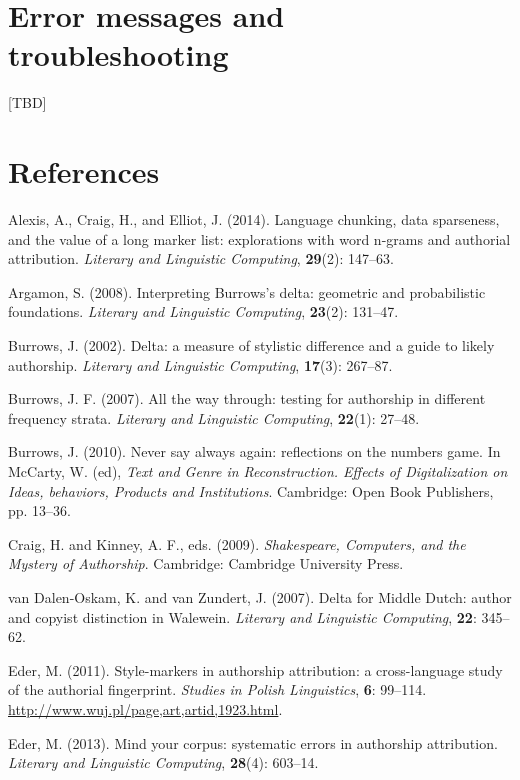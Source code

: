 \documentclass[11pt,a4paper]{article}
\begin{document}
\section{Error messages and troubleshooting}

[TBD]


\section*{References}


\indent

Alexis, A., Craig, H., and Elliot, J. (2014). Language chunking, data
sparseness, and the value of a long marker list: explorations with
word n-grams and authorial attribution. \textit{Literary and Linguistic
Computing}, \textbf{29}(2): 147--63.

Argamon, S. (2008). Interpreting Burrows’s delta: geometric and probabilistic
foundations. \textit{Literary and Linguistic Computing}, \textbf{23}(2):
131--47.

Burrows, J. (2002). Delta: a measure of stylistic difference and a
guide to likely authorship. \textit{Literary and Linguistic Computing},
\textbf{17}(3): 267--87.

Burrows, J. F. (2007). All the way through: testing for authorship
in different frequency strata. \textit{Literary and Linguistic Computing},
\textbf{22}(1): 27--48.

Burrows, J. (2010). Never say always again: reflections on the numbers
game. In McCarty, W. (ed), \textit{Text and Genre in Reconstruction.
Effects of Digitalization on Ideas, behaviors, Products and Institutions}.
Cambridge: Open Book Publishers, pp. 13--36.

Craig, H. and Kinney, A. F., eds. (2009). \textit{Shakespeare, Computers,
and the Mystery of Authorship}. Cambridge: Cambridge University Press.

van Dalen-Oskam, K. and van Zundert, J. (2007). Delta for Middle Dutch:
author and copyist distinction in Walewein. \textit{Literary and Linguistic
Computing}, \textbf{22}: 345–62.

Eder, M. (2011). Style-markers in authorship attribution: a cross-language
study of the authorial fingerprint. \textit{Studies in Polish Linguistics},
\textbf{6}: 99--114. \url{http://www.wuj.pl/page,art,artid,1923.html}.

Eder, M. (2013). Mind your corpus: systematic errors in authorship
attribution. \textit{Literary and Linguistic Computing}, 
\textbf{28}(4): 603--14.
\end{document}
